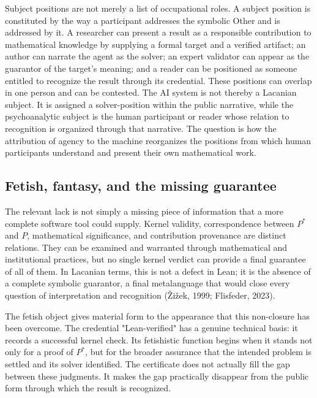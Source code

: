 \documentclass[pdflatex,sn-apa]{sn-jnl}
\begin{document}
Subject positions are not merely a list of occupational roles. A subject position is constituted by the way a participant addresses the symbolic Other and is addressed by it. A researcher can present a result as a responsible contribution to mathematical knowledge by supplying a formal target and a verified artifact; an author can narrate the agent as the solver; an expert validator can appear as the guarantor of the target's meaning; and a reader can be positioned as someone entitled to recognize the result through its credential. These positions can overlap in one person and can be contested. The AI system is not thereby a Lacanian subject. It is assigned a solver-position within the public narrative, while the psychoanalytic subject is the human participant or reader whose relation to recognition is organized through that narrative. The question is how the attribution of agency to the machine reorganizes the positions from which human participants understand and present their own mathematical work.
\subsection{Fetish, fantasy, and the missing guarantee}

The relevant lack is not simply a missing piece of information that a more complete software tool could supply. Kernel validity, correspondence between \(P^*\) and \(P\), mathematical significance, and contribution provenance are distinct relations. They can be examined and warranted through mathematical and institutional practices, but no single kernel verdict can provide a final guarantee of all of them. In Lacanian terms, this is not a defect in Lean; it is the absence of a complete symbolic guarantor, a final metalanguage that would close every question of interpretation and recognition (Žižek, 1999; Flisfeder, 2023).

The fetish object gives material form to the appearance that this non-closure has been overcome. The credential "Lean-verified" has a genuine technical basis: it records a successful kernel check. Its fetishistic function begins when it stands not only for a proof of \(P^*\), but for the broader assurance that the intended problem is settled and its solver identified. The certificate does not actually fill the gap between these judgments. It makes the gap practically disappear from the public form through which the result is recognized.
\end{document}

